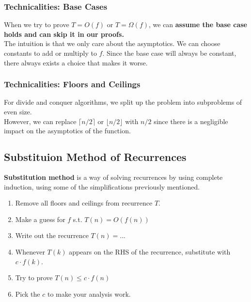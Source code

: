\documentclass{article}
\begin{document}
\subsubsection{Technicalities: Base Cases}
When we try to prove $T = O(f)$ or $T = \Omega(f)$, we can \textbf{assume the base case holds and can skip it in our proofs.}\\
The intuition is that we only care about the asymptotics.
We can choose constants to add or multiply to $f$. Since the base case will always be constant, there always exists a choice that makes it worse.

\subsubsection{Technicalities: Floors and Ceilings}
For divide and conquer algorithms, we split up the problem into subproblems of even size.\\
However, we can replace $\lceil n/2 \rceil$ or $\lfloor n/2 \rfloor$ with $n/2$ since there is a negligible impact on the asymptotics of the function.

\subsection{Substituion Method of Recurrences}
\textbf{Substitution method} is a way of solving recurrences by using complete induction, using some of the simplifications previously mentioned.\\
\begin{enumerate}
    \item Remove all floors and ceilings from recurrence $T$.
    \item Make a guess for $f$ s.t. $T(n) = O(f(n))$
    \item Write out the recurrence $T(n) = ...$
    \item Whenever $T(k)$ appears on the RHS of the recurrence, substitute with $c \cdot f(k)$.
    \item Try to prove $T(n) \leq c \cdot f(n)$
    \item Pick the $c$ to make your analysis work.
\end{enumerate}
\end{document}
